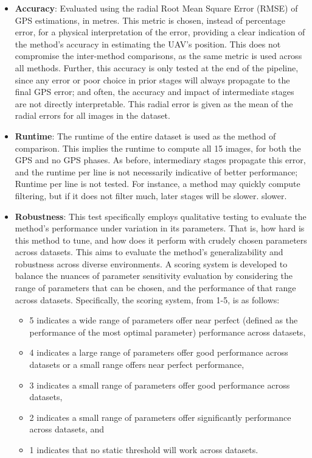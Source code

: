 \begin{itemize}
    \item \textbf{Accuracy}: Evaluated using the radial Root Mean Square Error (RMSE) of GPS estimations, in metres. This metric is chosen, instead of percentage error, for a physical interpretation of the error, providing a clear indication of the method's accuracy in estimating the UAV's position. This does not compromise the inter-method comparisons, as the same metric is used across all methods. Further, this accuracy is only tested at the end of the pipeline, since any error or poor choice in prior stages will always propagate to the final GPS error; and often, the accuracy and impact of intermediate stages are not directly interpretable. This radial error is given as the mean of the radial errors for all images in the dataset. 
    
    \item \textbf{Runtime}: The runtime of the entire dataset is used as the method of comparison. This implies the runtime to compute all 15 images, for both the GPS and no GPS phases. As before, intermediary stages propagate this error, and the runtime per line is not necessarily indicative of better performance; Runtime per line is not tested. For instance, a method may quickly compute filtering, but if it does not filter much, later stages will be slower.
    slower.
    \item \textbf{Robustness}: This test specifically employs qualitative testing to evaluate the method's performance under variation in its parameters. That is, how hard is this method to tune, and how does it perform with crudely chosen parameters across datasets. This aims to evaluate the method's generalizability and robustness across diverse environments. A scoring system is developed to balance the nuances of parameter sensitivity evaluation by considering the range of parameters that can be chosen, and the performance of that range across datasets. Specifically, the scoring system, from 1-5, is as follows: 
        \begin{itemize}
            \item 5 indicates a wide range of parameters offer near perfect (defined as the performance of the most optimal parameter) performance across datasets,
            \item 4 indicates a large range of parameters offer good performance across datasets or a small range offers near perfect performance,
            \item 3 indicates a small range of parameters offer good performance across datasets,
            \item 2 indicates a small range of parameters offer significantly performance across datasets, and
            \item 1 indicates that no static threshold will work across datasets.
        \end{itemize}
    
\end{itemize}


